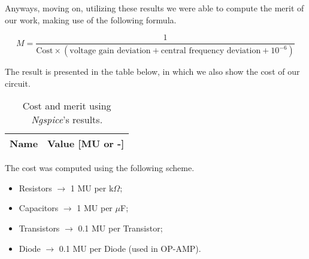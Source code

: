 \clearpage

Anyways, moving on, utilizing these results we were able to compute the merit of our work, making use of the following formula.

\begin{equation}
M = \frac{1}{\text{Cost}\times \left(\text{voltage gain deviation} + \text{central frequency deviation} + 10^{-6}\right)}
\end{equation}

The result is presented in the table below, in which we also show the cost of our circuit.

\begin{table}[h]
  \centering
  \begin{tabular}{|l|r|}
    \hline
    {\bf Name} & {\bf Value [MU or -]} \\ \hline
    
  \end{tabular}
  \caption{Cost and merit using \emph{Ngspice}'s results.}
  \label{tab:CostAndMerit}
\end{table}

The cost was computed using the following scheme.

\begin{itemize}
  \item Resistors $\rightarrow$ 1 MU per k$\Omega$;
  \item Capacitors $\rightarrow$ 1 MU per $\mu$F;
  \item Transistors $\rightarrow$ 0.1 MU per Transistor;
  \item Diode $\rightarrow$ 0.1 MU per Diode (used in OP-AMP).
\end{itemize}